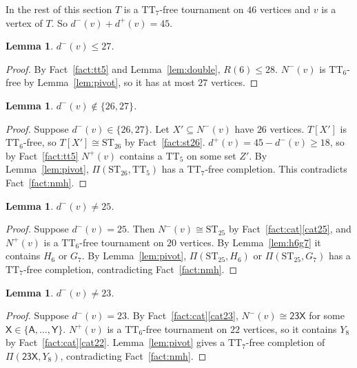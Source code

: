 \documentclass[11pt]{amsart}
\newtheorem{lemma}[theorem]{Lemma}
\theoremstyle{definition}
\theoremstyle{remark}
\newcommand{\TT}[1]{\mathrm{TT}_{#1}}
\newcommand{\ST}[1]{\mathrm{ST}_{#1}}
\newcommand{\cl}[1]{\textsf{#1}}
\newcommand{\Piv}[2]{\Pi(#1,#2)}
\newcommand{\Np}{N^{+}}
\newcommand{\Nm}{N^{-}}
\newcommand{\dpl}{d^{+}}
\newcommand{\dmi}{d^{-}}
\begin{document}
In the rest of this section $T$ is a $\TT{7}$-free tournament on $46$ vertices
and $v$ is a vertex of $T$. So $\dmi(v)+\dpl(v)=45$.

\begin{lemma}\label{lem:le27}
$\dmi(v) \le 27$.
\end{lemma}

\begin{proof}
By Fact~\ref{fact:tt5} and Lemma~\ref{lem:double}, $R(6) \le 28$. $\Nm(v)$ is
$\TT{6}$-free by Lemma~\ref{lem:pivot}, so it has at most $27$ vertices.
\end{proof}

\begin{lemma}\label{lem:26}
$\dmi(v) \notin \{26,27\}$.
\end{lemma}

\begin{proof}
Suppose $\dmi(v) \in \{26,27\}$. Let $X' \subseteq \Nm(v)$ have $26$ vertices.
$T[X']$ is $\TT{6}$-free, so $T[X'] \cong \ST{26}$ by Fact~\ref{fact:st26}.
$\dpl(v) = 45-\dmi(v) \ge 18$, so by Fact~\ref{fact:tt5} $\Np(v)$ contains a
$\TT{5}$ on some set $Z'$. By Lemma~\ref{lem:pivot},
$\Piv{\ST{26}}{\TT{5}}$ has a $\TT{7}$-free completion. This contradicts
Fact~\ref{fact:nmh}.
\end{proof}

\begin{lemma}\label{lem:25}
$\dmi(v) \ne 25$.
\end{lemma}

\begin{proof}
Suppose $\dmi(v)=25$. Then $\Nm(v) \cong \ST{25}$ by Fact~\ref{fact:cat}\ref{cat25},
and $\Np(v)$ is a $\TT{6}$-free tournament on $20$ vertices. By
Lemma~\ref{lem:h6g7} it contains $H_6$ or $G_7$. By Lemma~\ref{lem:pivot},
$\Piv{\ST{25}}{H_6}$ or $\Piv{\ST{25}}{G_7}$ has a $\TT{7}$-free completion,
contradicting Fact~\ref{fact:nmh}.
\end{proof}

\begin{lemma}\label{lem:23}
$\dmi(v) \ne 23$.
\end{lemma}

\begin{proof}
Suppose $\dmi(v)=23$. By Fact~\ref{fact:cat}\ref{cat23},
$\Nm(v) \cong \cl{23X}$ for some $\cl{X} \in \{\cl{A},\dots,\cl{Y}\}$.
$\Np(v)$ is a $\TT{6}$-free tournament on $22$ vertices, so it contains $Y_8$
by Fact~\ref{fact:cat}\ref{cat22}. Lemma~\ref{lem:pivot} gives a $\TT{7}$-free
completion of $\Piv{\cl{23X}}{Y_8}$, contradicting Fact~\ref{fact:nmh}.
\end{proof}
\end{document}
